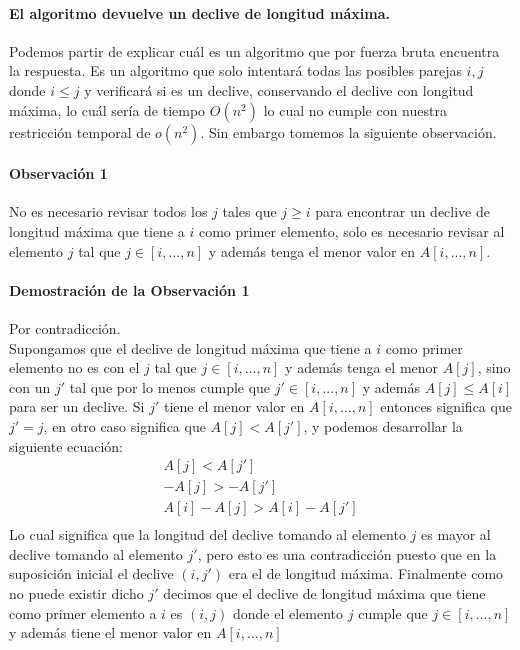 \documentclass[12pt]{article}
\begin{document}
\paragraph{El algoritmo devuelve un declive de longitud máxima.}
Podemos partir de explicar cuál es un algoritmo que por fuerza bruta encuentra la respuesta. Es un algoritmo que solo intentará todas las posibles parejas $i,j$ donde $i\leq j$ y verificará si es un declive, conservando el declive con longitud máxima, lo cuál sería de tiempo $O(n^2)$ lo cual no cumple con nuestra restricción temporal de $o(n^2)$. Sin embargo tomemos la siguiente observación.
\paragraph{Observación 1} No es necesario revisar todos los $j$ tales que $j \geq i$ para encontrar un declive de longitud máxima que tiene a $i$ como primer elemento, solo es necesario revisar al elemento $j$ tal que $j \in [i,...,n]$ y además tenga el menor valor en $A[i,...,n]$. 
\paragraph{Demostración de la Observación 1} Por contradicción.\\
Supongamos que el declive de longitud máxima que tiene a $i$ como primer elemento no es con el $j$ tal que $j \in [i,...,n]$ y además tenga el menor $A[j]$, sino con un $j'$ tal que por lo menos cumple que $j' \in [i,...,n]$ y además $A[j] \leq A[i]$ para ser un declive. Si $j'$ tiene el menor valor en $A[i,...,n]$ entonces significa que $j' = j$, en otro caso significa que $A[j]< A[j']$, y podemos desarrollar la siguiente ecuación:
\begin{equation}
	\begin{split}
	A[j]< A[j']\\ 
	-A[j]> -A[j']\\
	A[i]-A[j]> A[i]-A[j']\\
	\end{split}
\end{equation}
Lo cual significa que la longitud del declive tomando al elemento $j$ es mayor al declive tomando al elemento $j'$, pero esto es una contradicción puesto que en la suposición inicial el declive $(i, j')$ era el de longitud máxima.
Finalmente como no puede existir dicho $j'$ decimos que el declive de longitud máxima que tiene como primer elemento a $i$ es $(i,j)$ donde el elemento $j$ cumple que $j \in [i,...,n]$ y además tiene el menor valor en $A[i,...,n]$
\end{document}

